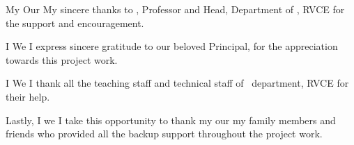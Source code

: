 \ifPG My \else \ifStuNameBUsed Our \else My \fi\fi sincere thanks to \textbf{\printHOD}, Professor and Head, Department of \printDepartmentLF, RVCE for the support and encouragement.\\ \par

\ifPG I \else \ifStuNameBUsed We \else I \fi\fi express sincere gratitude to our beloved Principal, \textbf{\printPrincipal} for the appreciation towards this project work.\\ \par

\ifPG I \else\ifStuNameBUsed We \else I \fi\fi thank all the teaching staff and technical staff of \printDepartmentLF\, department, RVCE for their help.\\ \par 

Lastly, \ifPG I \else\ifStuNameBUsed we \else I \fi\fi take this opportunity to thank \ifPG my \else\ifStuNameBUsed our \else my \fi\fi family members and friends who provided all the backup support throughout the project work.\\ \par

